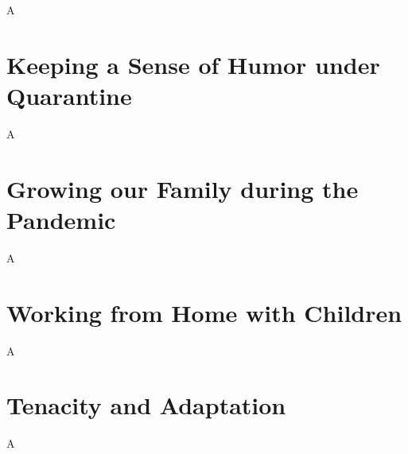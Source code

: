 \documentclass[../../main.tex]{subfiles}
\begin{document}
\label{sec:covid}
A

\section{Keeping a Sense of Humor under Quarantine}

A

\section{Growing our Family during the Pandemic}

A

\section{Working from Home with Children}

A

\section{Tenacity and Adaptation}

A
\end{document}
